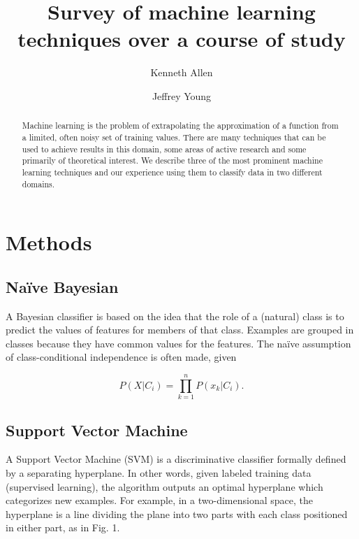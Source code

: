 \documentclass[format=acmlarge]{acmart}
\begin{document}
\title{Survey of machine learning techniques over a course of study}

\author{Kenneth Allen}

\author{Jeffrey Young}

\begin{abstract}
Machine learning is the problem of extrapolating the approximation of a function from a limited, often noisy set of training values.  There are many techniques that can be used to achieve results in this domain, some areas of active research and some primarily of theoretical interest.  We describe three of the most prominent machine learning techniques and our experience using them to classify data in two different domains.
\end{abstract}


\maketitle

\section{Methods}
\subsection{Na\"{i}ve Bayesian}
A Bayesian classifier is based on the idea that the role of a (natural) class is to predict the values of features for members of that class. Examples are grouped in classes because they have common values for the features.  The na\"{i}ve assumption of class-conditional independence is often made, given

$$P(X|C_i) = \prod_{k = 1}^n P(x_k|C_i) .$$

\subsection{Support Vector Machine}
A Support Vector Machine (SVM) is a discriminative classifier formally defined by a separating hyperplane. In other words, given labeled training data (supervised learning), the algorithm outputs an optimal hyperplane which categorizes new examples. For example, in a two-dimensional space, the hyperplane is a line dividing the plane into two parts with each class positioned in either part, as in Fig. 1.
\end{document}
